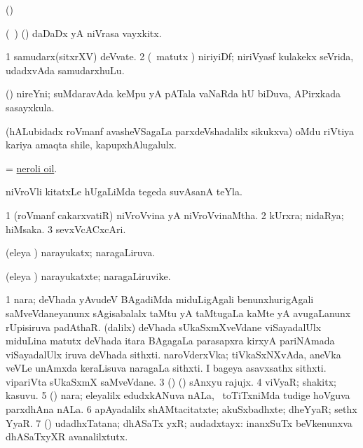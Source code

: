 \bentry
{}
\gl{\saMkiSx}
\bmng
(\birx)  
\emng
\eentry

\bentry
{}
\gl{\nA}
\bmng
(\kanmu\ \ame) (\ashi) daDaDx yA niVrasa vayxkitx. 
\emng
\eentry

\bentry
{}
\gl{\nA}
\bmng
\bnum
\num{1} samudarx(sitxrXV) deVvate. 
\num{2} (\pArxvi\ matutx \jiVvi) niriyiDf; niriVyasf kulakekx seVrida, udadxvAda samudarxhuLu. 
\enum
\emng
\eentry

\bentry
{}
\gl{\nA}
\bmng
(\savi) nireYni; suMdaravAda keMpu yA pATala vaNaRda hU biDuva, \da APirxkada sasayxkula. 
\emng
\eentry

\bentry
{}
\gl{\nA}
\expl{\It}
\bmng
(hALubidadx roVmanf avasheVSagaLa parxdeVshadalilx sikukxva) oMdu riVtiya kariya amaqta shile, kapupxhAlugalulx. 
\emng
\eentry

\bentry
{}
\gl{\nA}
\bmng
= \hyperlink{neroli oil}{neroli oil}. 
\emng
\eentry

\bentry
{}
\gl{\nA}
\bmng
niVroVli kitatxLe hUgaLiMda tegeda suvAsanA teYla. 
\emng
\eentry

\bentry
{}
\gl{\gu}
\bmng
\bnum
\num{1} (roVmanf cakarxvatiR) niVroVvina yA niVroVvinaMtha. 
\num{2} kUrxra; nidaRya; hiMsaka. 
\num{3} sevxVcACxcAri. 
\enum
\emng
\eentry

\bentry
{}
\gl{\gu}
\bmng
(eleya \vi) narayukatx; naragaLiruva. 
\emng
\eentry

\bentry
{}
\gl{\nA}
\bmng
(eleya \vi) narayukatxte; naragaLiruvike. 
\emng
\eentry

\bentry
{}
\gl{\nA}
\bmng
\bnum
\num{1} nara; deVhada yAvudeV BAgadiMda miduLigAgali benunxhurigAgali saMveVdaneyanunx sAgisabalalx taMtu yA taMtugaLa kaMte yA avugaLanunx rUpisiruva padAthaR. 
 (\bava dalilx) 
\banum
{} deVhada sUkaSxmXveVdane viSayadalUlx miduLina matutx deVhada itara BAgagaLa parasapxra kirxyA pariNAmada viSayadalUlx iruva deVhada sithxti. 
 naroVderxVka; tiVkaSxNXvAda, aneVka veVLe unAmxda keraLisuva naragaLa sithxti. 
 I bageya asavxsathx sithxti. 
 vipariVta sUkaSxmX saMveVdane. 
\eanum
\numie
\num{3} (\kAparx) (\pArxparx) sAnxyu rajujx. 
\num{4} viVyaR; shakitx; kasuvu. 
\num{5} (\savi) nara; eleyalilx edudxkANuva nALa, \kanmu\ toTiTxniMda tudige hoVguva parxdhAna nALa. 
\num{6} apAyadalilx shAMtacitatxte; akuSxbadhxte; dheYyaR; sethx YyaR. 
\num{7} (\AmA) udadhxTatana; dhASaTx yxR; audadxtayx:  inanxSuTx beVkenunxva dhASaTxyXR avanalilxtutx. 
\enum
\emng

